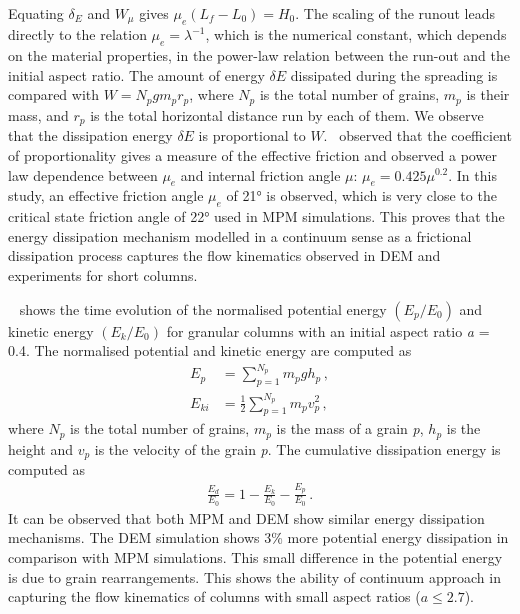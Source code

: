 Equating $\delta_E$ and $W_{\mu}$ gives $\mu_e (L_f - L_0) = H_0$. The scaling
of the runout leads directly to the relation $\mu_e = \lambda^{-1}$, which is 
the numerical constant, which depends on the 
material properties, in the power-law relation between the run-out and the 
initial aspect ratio. 
The amount of energy $\delta E$ dissipated 
during the spreading is compared with $W = N_p g m_p r_p$, where $N_p$ is the 
total number of grains, $m_p$ is their mass, and $r_p$ is the total horizontal 
distance run by each of them. We observe that the dissipation energy $\delta E$ 
is proportional to $W$.~\cite{Staron2007a} observed that the coefficient of 
proportionality gives a measure of the effective friction and 
observed a power law dependence between $\mu_e$ and internal friction angle 
$\mu$: $\mu_e=0.425\mu^{0.2}$. In this study, an effective friction angle 
$\mu_e$ of 21\si{\degree} is observed, which is very close to the critical 
state friction angle of 22\si{\degree} used in MPM simulations. This proves 
that the energy 
dissipation mechanism modelled in a continuum sense as a frictional dissipation 
process captures the flow kinematics observed in DEM and experiments for short 
columns.

~ shows the time evolution of the normalised potential 
energy $(E_{p}/E_0)$ and kinetic energy $(E_{k}/E_0)$ for granular columns with 
an initial aspect ratio \textit{a} = 0.4. The normalised potential and kinetic 
energy 
are computed as
%
\begin{align}
E_p & = \sum\limits_{p=1}^{N_p}{m_p g h_p} \,, \\
E_{ki} & = \frac{1}{2}\sum\limits_{p=1}^{N_p}{m_p v_p^2} \,,
\end{align}
%
where $N_p$ is the total number of grains, $m_p$ is 
the mass of a grain \textit{p}, $h_p$ is the height and 
$v_p$ is the velocity of the grain \textit{p}. The cumulative dissipation 
energy is computed as
%
\begin{align}
\frac{E_d}{E_0} = 1 - \frac{E_k}{E_0} - \frac{E_p}{E_0} \,.
\end{align}
%
It can be observed that both MPM and DEM show similar energy dissipation 
mechanisms. The DEM simulation shows 3\% more potential energy dissipation in 
comparison with MPM simulations. This small difference in the potential energy 
is due to grain rearrangements. This shows the ability of continuum approach in 
capturing the flow kinematics of columns with small aspect ratios ($a \le 
2.7$). 


